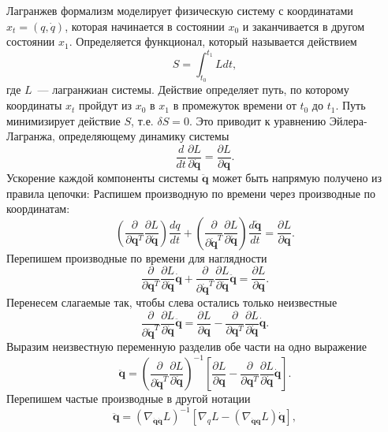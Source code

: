 \documentclass[a4paper, 12pt]{article}
\begin{document}
Лагранжев формализм моделирует физическую систему с координатами $x_t = (q, \dot{q})$, которая начинается в состоянии $x_0$ и заканчивается в другом состоянии $x_1$. Определяется функционал, который называется действием
\begin{equation}
S=\int_{t_{0}}^{t_{1}} L d t,
\end{equation}
где $L$~--- лагранжиан системы. Действие определяет путь, по которому координаты $x_t$ пройдут из $x_0$ в $x_1$ в промежуток времени от $t_0$ до $t_1$. Путь минимизирует действие $S$, т.е. $\delta S = 0$. Это приводит к уравнению Эйлера-Лагранжа, определяющему динамику системы
\begin{equation}
\frac{d}{d t} \frac{\partial L}{\partial \dot{\mathbf{q}}}=\frac{\partial L}{\partial \mathbf{q}}.
\end{equation}
Ускорение каждой компоненты системы $ \ddot{\mathbf{q}}$ может быть напрямую получено из правила цепочки:
Распишем производную по времени через производные по координатам:
\[
\left(\frac{\partial}{\partial \mathbf{q}^T} \frac{\partial L}{\partial \dot{\mathbf{q}}} \right) \frac{d q}{d t}+\left(\frac{\partial}{\partial \dot{\mathbf{q}}^T} \frac{\partial L}{\partial \dot{\mathbf{q}}} \right)  \frac{d \dot{\mathbf{q}}}{d t}
= \frac{\partial L}{\partial \mathbf{q}}.
\]
Перепишем производные по времени для наглядности
\[
\frac{\partial}{\partial \mathbf{q}^T} \frac{\partial L}{\partial \dot{\mathbf{q}}} \dot{\mathbf{q}}+\frac{\partial}{\partial \dot{\mathbf{q}}^T} \frac{\partial L}{\partial \dot{\mathbf{q}}} \ddot{\mathbf{q}} 
= \frac{\partial L}{\partial \mathbf{q}}.
\]
Перенесем слагаемые так, чтобы слева остались только неизвестные
\[
\frac{\partial}{\partial \dot{\mathbf{q}}^T} \frac{\partial L}{\partial \dot{\mathbf{q}}} \ddot{\mathbf{q}} 
= \frac{\partial L}{\partial \mathbf{q}}-\frac{\partial}{\partial \mathbf{q}^T} \frac{\partial L}{\partial \dot{\mathbf{q}}} \dot{\mathbf{q}}.
\]
Выразим неизвестную переменную разделив обе части на одно выражение
\[
\ddot{\mathbf{q}} 
= \left(\frac{\partial}{\partial \dot{\mathbf{q}}^T} \frac{\partial L}{\partial \dot{\mathbf{q}}}\right)^{-1}\left[\frac{\partial L}{\partial \mathbf{q}}-\frac{\partial}{\partial \mathbf{q}^T} \frac{\partial L}{\partial \dot{\mathbf{q}}} \dot{\mathbf{q}}\right].
\]
Перепишем частые производные в другой нотации
\begin{equation}
\ddot{\mathbf{q}} 
= \left(\nabla_{\dot{\mathbf{q}} \dot{\mathbf{q}}} L\right)^{-1}\left[\nabla_{q} L-\left(\nabla_{\dot{\mathbf{q}}\mathbf{q}} L\right) \dot{\mathbf{q}}\right], 
\end{equation}
\end{document}
